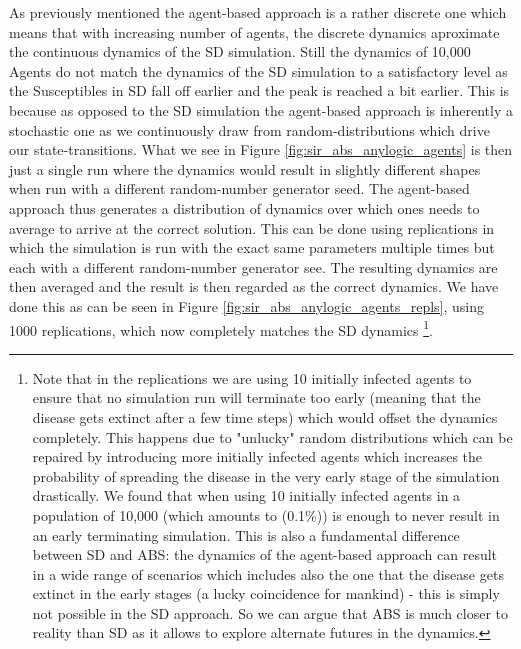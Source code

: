 As previously mentioned the agent-based approach is a rather discrete one which means that with increasing number of agents, the discrete dynamics aproximate the continuous dynamics of the SD simulation. Still the dynamics of 10,000 Agents do not match the dynamics of the SD simulation to a satisfactory level as the Susceptibles in SD fall off earlier and the peak is reached a bit earlier. This is because as opposed to the SD simulation the agent-based approach is inherently a stochastic one as we continuously draw from random-distributions which drive our state-transitions. What we see in Figure \ref{fig:sir_abs_anylogic_agents} is then just a single run where the dynamics would result in slightly different shapes when run with a different random-number generator seed. The agent-based approach thus generates a distribution of dynamics over which ones needs to average to arrive at the correct solution. This can be done using replications in which the simulation is run with the exact same parameters multiple times but each with a different random-number generator see. The resulting dynamics are then averaged and the result is then regarded as the correct dynamics. We have done this as can be seen in Figure \ref{fig:sir_abs_anylogic_agents_repls}, using 1000 replications, which now completely matches the SD dynamics \footnote{Note that in the replications we are using 10 initially infected agents to ensure that no simulation run will terminate too early (meaning that the disease gets extinct after a few time steps) which would offset the dynamics completely. This happens due to "unlucky" random distributions which can be repaired by introducing more initially infected agents which increases the probability of spreading the disease in the very early stage of the simulation drastically. We found that when using 10 initially infected agents in a population of 10,000 (which amounts to (0.1\%)) is enough to never result in an early terminating simulation. This is also a fundamental difference between SD and ABS: the dynamics of the agent-based approach can result in a wide range of scenarios which includes also the one that the disease gets extinct in the early stages (a lucky coincidence for mankind) - this is simply not possible in the SD approach. So we can argue that ABS is much closer to reality than SD as it allows to explore alternate futures in the dynamics.}.

